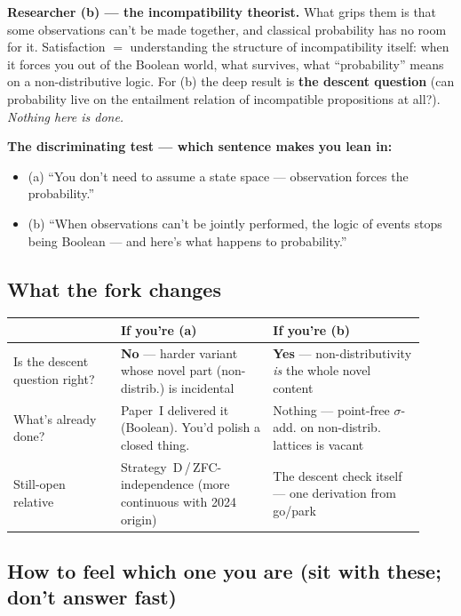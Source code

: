 \documentclass[11pt]{article}
\begin{document}
\medskip
\noindent
\textbf{Researcher (b) --- the incompatibility theorist.} What grips them is that
some observations can't be made together, and classical probability has no room
for it. Satisfaction $=$ understanding the structure of incompatibility itself:
when it forces you out of the Boolean world, what survives, what ``probability''
means on a non-distributive logic. For (b) the deep result is \textbf{the descent
question} (can probability live on the entailment relation of incompatible
propositions at all?). \emph{Nothing here is done.}

\medskip
\noindent
\textbf{The discriminating test --- which sentence makes you lean in:}
\begin{itemize}[leftmargin=2em]
\item (a) ``You don't need to assume a state space --- observation forces the
probability.''
\item (b) ``When observations can't be jointly performed, the logic of events
stops being Boolean --- and here's what happens to probability.''
\end{itemize}

\subsection{What the fork changes}

\begin{center}
\renewcommand{\arraystretch}{1.5}
\begin{tabular}{@{}p{0.24\linewidth} p{0.34\linewidth} p{0.34\linewidth}@{}}
\toprule
 & \textbf{If you're (a)} & \textbf{If you're (b)}\\
\midrule
Is the descent question right? &
\textbf{No} --- harder variant whose novel part (non-distrib.) is incidental &
\textbf{Yes} --- non-distributivity \emph{is} the whole novel content\\
What's already done? &
Paper~I delivered it (Boolean). You'd polish a closed thing. &
Nothing --- point-free $\sigma$-add. on non-distrib. lattices is vacant\\
Still-open relative &
Strategy~D\,/\,ZFC-independence (more continuous with 2024 origin) &
The descent check itself --- one derivation from go/park\\
\bottomrule
\end{tabular}
\end{center}

\subsection{How to feel which one you are (sit with these; don't answer fast)}
\end{document}
